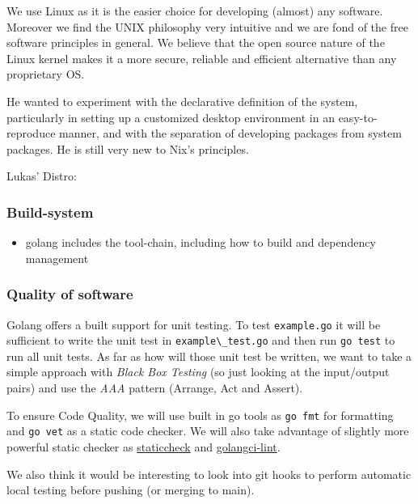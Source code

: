 \documentclass[a4paper,english,10pt,NET]{tumarticle}
\begin{document}
We use Linux as it is the easier choice for developing (almost) any software. Moreover we find the UNIX philosophy very intuitive and we are fond of the free software principles in general. We believe that the open source nature of the Linux kernel makes it a more secure, reliable and efficient alternative than any proprietary OS.

He wanted to experiment with the declarative definition of the system, particularly in setting up a customized desktop environment in an easy-to-reproduce manner, and with the separation of developing packages from system packages. He is still very new to Nix's principles.

Lukas' Distro:


\subsubsection{Build-system}
\begin{itemize}
	\item golang includes the tool-chain, including how to build and dependency management
\end{itemize}

\subsubsection{Quality of software}

Golang offers a built support for unit testing. To test \verb|example.go| it will be sufficient to write the unit test in \verb|example\_test.go| and then run \verb|go test| to run all unit tests. As far as how will those unit test be written, we want to take a simple approach with \textit{Black Box Testing} (so just looking at the input/output pairs) and use the \textit{AAA} pattern (Arrange, Act and Assert).

To ensure Code Quality, we will use built in go tools as \verb|go fmt| for formatting and \verb|go vet| as a static code checker. We will also take advantage of slightly more powerful static checker as \href{https://staticcheck.dev/}{staticcheck} and \href{https://github.com/golangci/golangci-lint}{golangci-lint}.

We also think it would be interesting to look into git hooks to perform automatic local testing before pushing (or merging to main).

\end{document}
